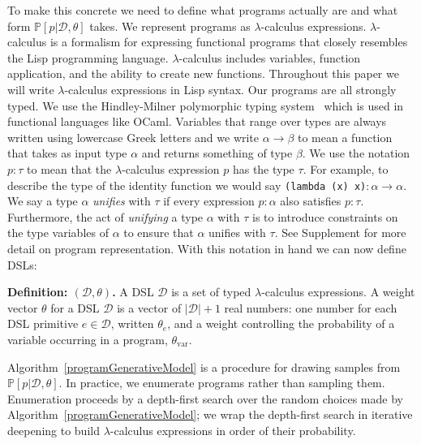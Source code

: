 \documentclass{article}
\newcommand{\code}[1]{{\footnotesize\texttt{#1}}}
\newcommand{\probability}{\mathds{P}} %
\begin{document}
To make this concrete we need to define what programs actually are and
what form $\probability[p |\mathcal{D},\theta]$ takes.
We represent programs as $\lambda$-calculus expressions.
$\lambda$-calculus is a formalism for expressing functional programs
that closely resembles the Lisp programming language.
$\lambda$-calculus includes variables, function application, and the ability to create new functions.
Throughout this paper we will write $\lambda$-calculus expressions in Lisp syntax.
Our programs are all strongly typed.
We use the Hindley-Milner polymorphic typing system~\cite{pierce} which is used in functional languages like OCaml.
Variables that range over types are always written using lowercase Greek letters
and we write $\alpha\to \beta$ to mean a function that takes as input type $\alpha$
and returns something of type $\beta$.
We use the notation $p:\tau$ to mean that the $\lambda$-calculus expression $p$
has the type $\tau$.
For example, to describe the type of the identity function
we would say \code{(lambda (x) x)}$:\alpha\to \alpha$.
We say a type $\alpha$ \emph{unifies} with $\tau$ if every expression
$p:\alpha$ also satisfies $p:\tau$. Furthermore, the act of \emph{unifying}
a type $\alpha$ with $\tau$ is to introduce constraints on the type
variables of $\alpha$ to ensure that $\alpha$ unifies with $\tau$.
See Supplement for more detail on program representation.
With this notation in hand we can now define DSLs:

\noindent\textbf{Definition: $(\mathcal{D},\theta)$.}
A DSL $\mathcal{D}$ is a set of typed $\lambda$-calculus expressions.
A weight vector $\theta$ for a DSL $\mathcal{D}$ is a vector of $|\mathcal{D}| + 1$ real numbers:
one number for each DSL primitive $e\in \mathcal{D}$, written $\theta_e$,
and a weight controlling the probability of a variable occurring in a program, $\theta_{\text{var}}$.

Algorithm~\ref{programGenerativeModel} is a procedure for drawing
samples from $\probability[p|\mathcal{D},\theta]$.  In practice, we
enumerate programs rather than sampling them.  Enumeration proceeds by
a depth-first search over the random choices made by
Algorithm~\ref{programGenerativeModel}; we wrap the depth-first search
in iterative deepening to build $\lambda$-calculus
expressions in order of their probability.
\end{document}
